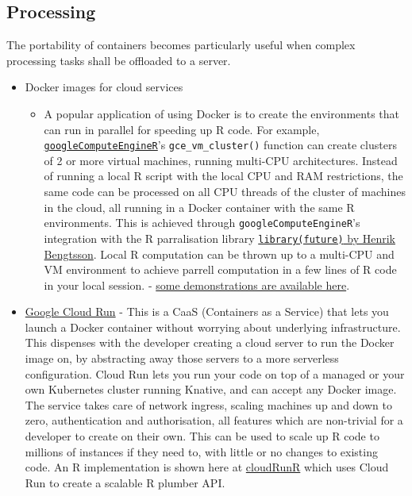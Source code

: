 \hypertarget{processing}{%
\subsection{Processing}\label{processing}}

\label{processing}

The portability of containers becomes particularly useful when complex
processing tasks shall be offloaded to a server.

\begin{itemize}
\tightlist
\item
  Docker images for cloud services

  \begin{itemize}
  \tightlist
  \item
    A popular application of using Docker is to create the environments
    that can run in parallel for speeding up R code. For example,
    \href{https://CRAN.R-project.org/package=googleComputeEngineR}{\texttt{googleComputeEngineR}}'s
    \texttt{gce\_vm\_cluster()} function can create clusters of 2 or
    more virtual machines, running multi-CPU architectures. Instead of
    running a local R script with the local CPU and RAM restrictions,
    the same code can be processed on all CPU threads of the cluster of
    machines in the cloud, all running in a Docker container with the
    same R environments. This is achieved through
    \texttt{googleComputeEngineR}'s integration with the R parralisation
    library
    \href{https://CRAN.R-project.org/package=future}{\texttt{library(future)}
    by Henrik Bengtsson}. Local R computation can be thrown up to a
    multi-CPU and VM environment to achieve parrell computation in a few
    lines of R code in your local session. -
    \href{https://cloudyr.github.io/googleComputeEngineR/articles/massive-parallel.html}{some
    demonstrations are available here}.
  \end{itemize}
\item
  \href{https://cloud.run}{Google Cloud Run} - This is a CaaS
  (Containers as a Service) that lets you launch a Docker container
  without worrying about underlying infrastructure. This dispenses with
  the developer creating a cloud server to run the Docker image on, by
  abstracting away those servers to a more serverless configuration.
  Cloud Run lets you run your code on top of a managed or your own
  Kubernetes cluster running Knative, and can accept any Docker image.
  The service takes care of network ingress, scaling machines up and
  down to zero, authentication and authorisation, all features which are
  non-trivial for a developer to create on their own. This can be used
  to scale up R code to millions of instances if they need to, with
  little or no changes to existing code. An R implementation is shown
  here at
  \href{https://github.com/MarkEdmondson1234/cloudRunR}{cloudRunR} which
  uses Cloud Run to create a scalable R plumber API.


\end{itemize}

